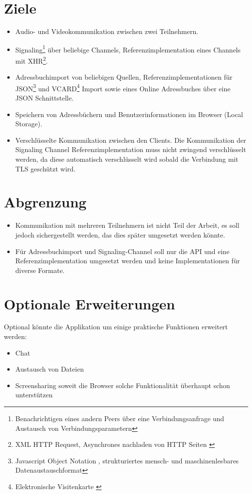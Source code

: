 	\section{Ziele}
		\begin{itemize}
			\item Audio- und Videokommunikation zwischen zwei Teilnehmern.
			\item Signaling\footnote{Benachrichtigen eines andern Peers über eine Verbindungsanfrage und Austausch von Verbindungsparametern} 
				über beliebige Channels, Referenzimplementation eines Channels mit 
				XHR\footnote{XML HTTP Request, Asynchrones nachladen von HTTP Seiten \cite{MDN-XHR-Cross-Site}}.
			\item Adressbuchimport von beliebigen Quellen, Referenzimplementationen für 
				JSON\footnote{Javascript Object Notation \cite{IETF-JSON-RFC}, strukturiertes mensch- und maschinenlesbares Datenaustauschformat} und 
				VCARD\footnote{Elektronische Visitenkarte \cite{IETF-vCard-RFC}} Import sowie eines Online Adressbuches über eine JSON Schnittstelle.
			\item Speichern von Adressbüchern und Benutzerinformationen im Browser 
				(Local Storage\cite{MDN-LocalStorage}).
			\item Verschlüsselte Kommunikation zwischen den Clients. Die Kommunikation der Signaling Channel Referenzimplementation muss nicht zwingend verschlüsselt werden, da diese automatisch verschlüsselt wird sobald die Verbindung mit TLS geschützt wird.
		\end{itemize}
		
	\section{Abgrenzung}
		\begin{itemize}
			\item Kommunikation mit mehreren Teilnehmern ist nicht Teil der Arbeit, es soll jedoch sichergestellt werden, das dies später umgesetzt werden könnte.
			\item Für Adressbuchimport und Signaling-Channel soll nur die API und eine
			Referenzimplementation umgesetzt werden und keine Implementationen für diverse Formate.
		\end{itemize}
		
	\section{Optionale Erweiterungen}
		Optional könnte die Applikation um einige praktische Funktionen erweitert werden:		
		\begin{itemize}
			\item Chat
			\item Austausch von Dateien
			\item Screensharing soweit die Browser solche Funktionalität überhaupt schon unterstützen
		\end{itemize}